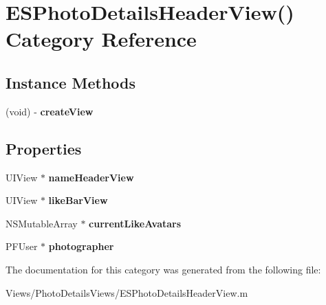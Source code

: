 \hypertarget{category_e_s_photo_details_header_view_07_08}{}\section{E\+S\+Photo\+Details\+Header\+View() Category Reference}
\label{category_e_s_photo_details_header_view_07_08}
\subsection*{Instance Methods}
\begin{DoxyCompactItemize}
\item 
\hypertarget{category_e_s_photo_details_header_view_07_08_a58416f44d08d9c0683ea3708e8d75629}{}(void) -\/ {\bfseries create\+View}\label{category_e_s_photo_details_header_view_07_08_a58416f44d08d9c0683ea3708e8d75629}

\end{DoxyCompactItemize}
\subsection*{Properties}
\begin{DoxyCompactItemize}
\item 
\hypertarget{category_e_s_photo_details_header_view_07_08_a25e9fe1f0c1cb96f3a7d9e1ae810e646}{}U\+I\+View $\ast$ {\bfseries name\+Header\+View}\label{category_e_s_photo_details_header_view_07_08_a25e9fe1f0c1cb96f3a7d9e1ae810e646}

\item 
\hypertarget{category_e_s_photo_details_header_view_07_08_a1706abfe194eead90c425ec9773b9513}{}U\+I\+View $\ast$ {\bfseries like\+Bar\+View}\label{category_e_s_photo_details_header_view_07_08_a1706abfe194eead90c425ec9773b9513}

\item 
\hypertarget{category_e_s_photo_details_header_view_07_08_a4f8e4c7d53c6eca68b6fb89aaa7c6647}{}N\+S\+Mutable\+Array $\ast$ {\bfseries current\+Like\+Avatars}\label{category_e_s_photo_details_header_view_07_08_a4f8e4c7d53c6eca68b6fb89aaa7c6647}

\item 
\hypertarget{category_e_s_photo_details_header_view_07_08_a44409ebdafdb2f5ca99a943551c4f8a6}{}P\+F\+User $\ast$ {\bfseries photographer}\label{category_e_s_photo_details_header_view_07_08_a44409ebdafdb2f5ca99a943551c4f8a6}

\end{DoxyCompactItemize}


The documentation for this category was generated from the following file\+:\begin{DoxyCompactItemize}
\item 
Views/\+Photo\+Details\+Views/E\+S\+Photo\+Details\+Header\+View.\+m\end{DoxyCompactItemize}

